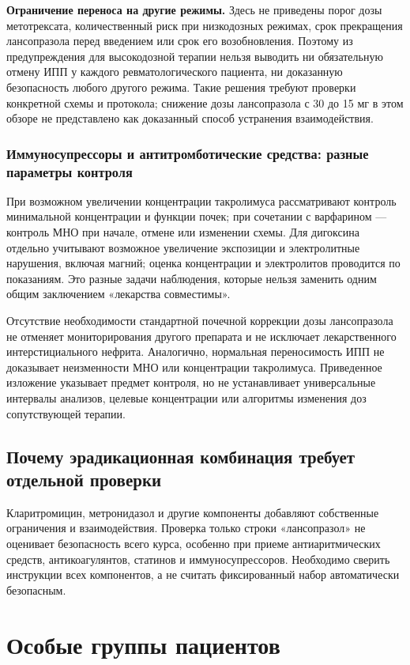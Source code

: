 \documentclass[11pt,a4paper,notitlepage]{report}
\newcommand{\src}[1]{\unskip\space\cite{#1}}
\begin{document}
\textbf{Ограничение переноса на другие режимы.} Здесь не приведены порог дозы метотрексата, количественный риск при низкодозных режимах, срок прекращения лансопразола перед введением или срок его возобновления. Поэтому из предупреждения для высокодозной терапии нельзя выводить ни обязательную отмену ИПП у каждого ревматологического пациента, ни доказанную безопасность любого другого режима. Такие решения требуют проверки конкретной схемы и протокола; снижение дозы лансопразола с 30 до 15 мг в этом обзоре не представлено как доказанный способ устранения взаимодействия.\src{uslabel}

\subsubsection{Иммуносупрессоры и антитромботические средства: разные параметры контроля}
При возможном увеличении концентрации такролимуса рассматривают контроль минимальной концентрации и функции почек; при сочетании с варфарином --- контроль МНО при начале, отмене или изменении схемы. Для дигоксина отдельно учитывают возможное увеличение экспозиции и электролитные нарушения, включая магний; оценка концентрации и электролитов проводится по показаниям. Это разные задачи наблюдения, которые нельзя заменить одним общим заключением «лекарства совместимы».\src{uslabel}

Отсутствие необходимости стандартной почечной коррекции дозы лансопразола не отменяет мониторирования другого препарата и не исключает лекарственного интерстициального нефрита. Аналогично, нормальная переносимость ИПП не доказывает неизменности МНО или концентрации такролимуса. Приведенное изложение указывает предмет контроля, но не устанавливает универсальные интервалы анализов, целевые концентрации или алгоритмы изменения доз сопутствующей терапии.\src{uslabel,hpra,safeain}

\subsection{Почему эрадикационная комбинация требует отдельной проверки}
Кларитромицин, метронидазол и другие компоненты добавляют собственные ограничения и взаимодействия. Проверка только строки «лансопразол» не оценивает безопасность всего курса, особенно при приеме антиаритмических средств, антикоагулянтов, статинов и иммуносупрессоров. Необходимо сверить инструкции всех компонентов, а не считать фиксированный набор автоматически безопасным.\src{uslabel,jhp}

\section{Особые группы пациентов}
\end{document}
